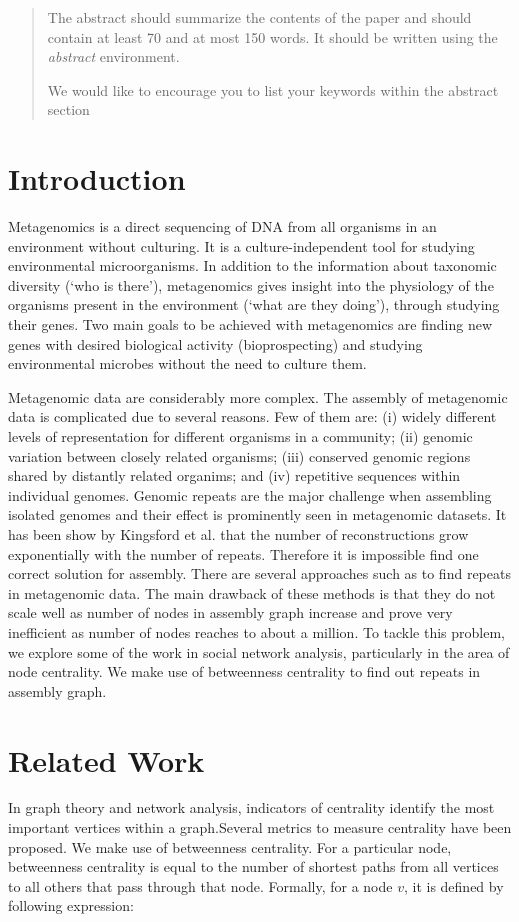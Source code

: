 \documentclass[runningheads,a4paper]{llncs}
\newcommand{\keywords}[1]{\par\addvspace\baselineskip
\noindent\keywordname\enspace\ignorespaces#1}
\begin{document}
\begin{abstract}
The abstract should summarize the contents of the paper and should
contain at least 70 and at most 150 words. It should be written using the
\emph{abstract} environment.
\keywords{We would like to encourage you to list your keywords within
the abstract section}
\end{abstract}


\section{Introduction}

Metagenomics is a direct sequencing of DNA from all organisms in an environment without culturing.  It is a culture-independent tool for studying environmental microorganisms. In addition to the information about taxonomic diversity (‘who is there’), metagenomics gives insight into the physiology of the organisms present in the environment (‘what are they doing’), through studying their genes. Two main goals to be achieved with metagenomics are finding new genes with desired biological activity (bioprospecting) and studying environmental microbes without the need to culture them.

Metagenomic data are considerably more complex. The assembly of metagenomic data is complicated due to several reasons. Few of them are: (i) widely different levels of representation for different organisms in a community; (ii) genomic variation between closely related organisms; (iii) conserved genomic regions shared by distantly related organims; and (iv) repetitive sequences within individual genomes. Genomic repeats are the major challenge when assembling isolated genomes and their effect is prominently seen in metagenomic datasets. It has been show by Kingsford et al.\cite{kingsford} that the number of reconstructions grow exponentially with the number of repeats. Therefore it is impossible find one correct solution for assembly. There are several approaches such as \cite{bambus} to find repeats in metagenomic data. The main drawback of these methods is that they do not scale well as number of nodes in assembly graph increase and prove very inefficient as number of nodes reaches to about a million. To tackle this problem, we explore some of the work in social network analysis, particularly in the area of node centrality. We make use of betweenness centrality to find out repeats in assembly graph. 

\section{Related Work}
In graph theory and network analysis, indicators of centrality identify the most important vertices within a graph.Several metrics to measure centrality have been proposed. We make use of betweenness centrality. For a particular node, betweenness centrality is equal to the number of shortest paths from all vertices to all others that pass through that node. Formally, for a node $v$, it is defined by following expression:
\end{document}
